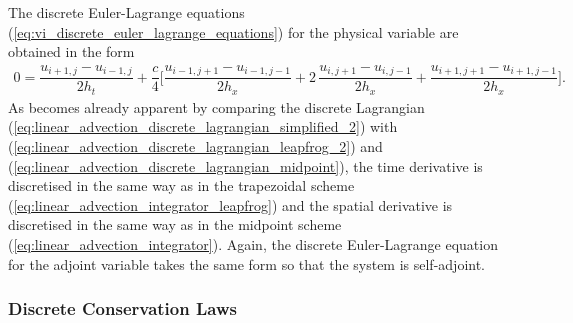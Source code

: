 \documentclass[12pt,a4paper,reqno]{article}
\begin{document}
The discrete Euler-Lagrange equations (\ref{eq:vi_discrete_euler_lagrange_equations}) for the physical variable are obtained in the form
\begin{align}\label{eq:linear_advection_integrator_simplified}
0 = \dfrac{u_{i+1, j} - u_{i-1, j}}{2 h_{t}} + \dfrac{c}{4} \bigg[ \dfrac{u_{i-1, j+1} - u_{i-1, j-1}}{2 h_{x}}
+ 2 \, \dfrac{u_{i, j+1} - u_{i, j-1}}{2 h_{x}} + \dfrac{u_{i+1, j+1} - u_{i+1, j-1}}{2 h_{x}} \bigg] .
\end{align}
As becomes already apparent by comparing the discrete Lagrangian (\ref{eq:linear_advection_discrete_lagrangian_simplified_2}) with (\ref{eq:linear_advection_discrete_lagrangian_leapfrog_2}) and (\ref{eq:linear_advection_discrete_lagrangian_midpoint}), the time derivative is discretised in the same way as in the trapezoidal scheme (\ref{eq:linear_advection_integrator_leapfrog}) and the spatial derivative is discretised in the same way as in the midpoint scheme (\ref{eq:linear_advection_integrator}).
Again, the discrete Euler-Lagrange equation for the adjoint variable takes the same form so that the system is self-adjoint.

\subsubsection*{Discrete Conservation Laws}
\end{document}

